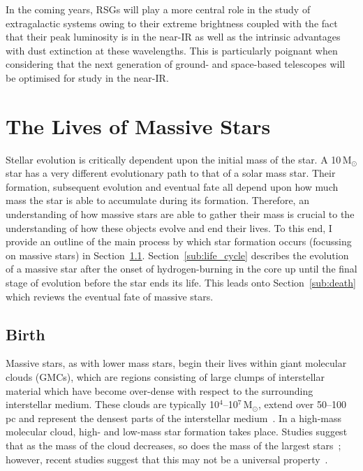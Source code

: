 {In the coming years, RSGs will play a more central role in the study of extragalactic systems owing to their extreme brightness coupled with the fact that their peak luminosity is in the near-IR as well as the intrinsic advantages with dust extinction at these wavelengths.
This is particularly poignant when considering that the next generation of ground- and space-based telescopes will be optimised for study in the near-IR.


\section{The Lives of Massive Stars} %
\label{sec:lives}

Stellar evolution is critically dependent upon the initial mass of the star.
A 10\,M$_{\odot}$ star has a very different evolutionary path to that of a solar mass star.
Their formation, subsequent evolution and eventual fate all depend upon how much mass the star is able to accumulate during its formation.
Therefore, an understanding of how massive stars are able to gather their mass is crucial to the understanding of how these objects evolve and end their lives.
To this end, I provide an outline of the main process by which star formation occurs (focussing on massive stars) in Section~\ref{sub:birth}. Section~\ref{sub:life_cycle} describes the evolution of a massive star after the onset of hydrogen-burning in the core up until the final stage of evolution before the star ends its life.
This leads onto Section~\ref{sub:death} which reviews the eventual fate of massive stars.

\subsection{Birth} %
\label{sub:birth}

Massive stars, as with lower mass stars, begin their lives within giant molecular clouds (GMCs), which are regions consisting of large clumps of interstellar material which have become over-dense with respect to the surrounding interstellar medium.
These clouds are typically 10$^{4}$--10$^{7}$\,M$_{\odot}$, extend over 50--100\,pc and represent the densest parts of the interstellar medium~\citep{Fukui10}.
In a high-mass molecular cloud, high- and low-mass star formation takes place.
Studies suggest that as the mass of the cloud decreases, so does the mass of the largest stars~\citep{Fukui10,Weidner10}; however, recent studies suggest that this may not be a universal property~\citep[e.g.][]{Bressert12}.

}
